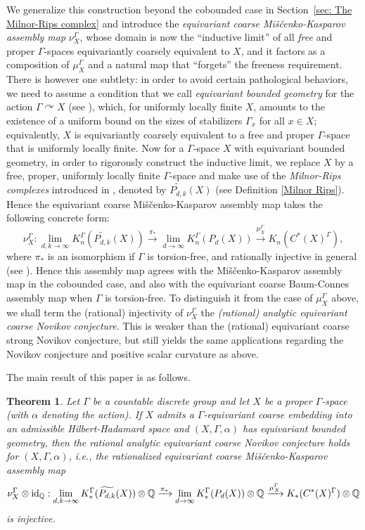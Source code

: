 \documentclass[11pt]{article}
\theoremstyle{definition}
\theoremstyle{plain}
\newtheorem{Thm}[Def]{Theorem}
\def\ox{\otimes}
\def\wt{\widetilde}
\def\ox{\otimes}
\def\Ga{\Gamma}
\begin{document}
We generalize this construction beyond the cobounded case in Section~\ref{sec: The Milnor-Rips complex} and introduce the \emph{equivariant coarse Miščenko-Kasparov assembly map} $\nu_X^{\Ga}$, whose domain is now the ``inductive limit'' of all \emph{free} and proper $\Ga$-spaces equivariantly coarsely equivalent to $X$, and it factors as a composition of $\mu_X^{\Ga}$ and a natural map that ``forgets'' the freeness requirement. 
There is however one subtlety: 
in order to avoid certain pathological behaviors, 
we need to assume a condition that we call \emph{equivariant bounded geometry} for the action $\Ga \curvearrowright X$ (see ), which, for uniformly locally finite $X$, amounts to the existence of a uniform bound on the sizes of stabilizers $\Ga_x$ for all $x \in X$; equivalently, $X$ is equivariantly coarsely equivalent to a free and proper $\Ga$-space that is uniformly locally finite. 
Now for a $\Ga$-space $X$ with equivariant bounded geometry, in order to rigorously construct the inductive limit, we replace $X$ by a free, proper, uniformly locally finite $\Ga$-space and make use of the \emph{Milnor-Rips complexes} introduced in \cite{Yu1995}, denoted by $\wt{P_{d,k}}(X)$ (see Definition \ref{Milnor Rips}). Hence the equivariant coarse Miščenko-Kasparov assembly map takes the following concrete form: 
\begin{equation}\label{MK assembly map}\nu_X^{\Ga}:\lim_{d,k\to\infty}K^{\Ga}_n(\wt{P_{d,k}}(X))\xrightarrow{\pi_*}\lim_{d\to\infty}K^{\Ga}_n(P_d(X))\xrightarrow{\mu_X^{\Ga}} K_n(C^*(X)^{\Ga}) ,
\end{equation}
where $\pi_*$ is an isomorphism if $\Ga$ is torsion-free, and rationally injective in general (see ). 
Hence this assembly map agrees with the Miščenko-Kasparov assembly map in the cobounded case, and also with the equivariant coarse Baum-Connes assembly map when $\Ga$ is torsion-free. 
To distinguish it from the case of $\mu_X^{\Ga}$ above, we shall term the (rational) injectivity of $\nu_X^{\Ga}$ the \emph{(rational) analytic equivariant coarse Novikov conjecture}. This is weaker than the (rational) equivariant coarse strong Novikov conjecture, but still yields the same applications regarding the Novikov conjecture and positive scalar curvature as above. 

 
The main result of this paper is as follows.

\begin{Thm}\label{main result with torsion}
	Let $\Gamma$ be a countable discrete group and let $X$ be a proper $\Gamma$-space (with $\alpha$ denoting the action).
    If $X$ admits a $\Ga$-equivariant coarse embedding into an admissible Hilbert-Hadamard space and $(X, \Ga, \alpha)$ has equivariant bounded geometry, then the rational analytic equivariant coarse Novikov conjecture holds for $(X, \Ga, \alpha)$, i.e., the rationalized equivariant coarse Miščenko-Kasparov assembly map
	$$\nu_X^{\Ga}\ox\operatorname{id}_\IQ:\lim_{d,k\to\infty}K^{\Ga}_*(\wt{P_{d,k}}(X))\ox\IQ\xrightarrow{\pi_*}\lim_{d\to\infty}K^{\Ga}_*(P_d(X))\ox\IQ\xrightarrow{\mu_X^{\Ga}} K_*(C^*(X)^{\Ga})\ox\IQ$$
	is injective.
\end{Thm}
\end{document}
